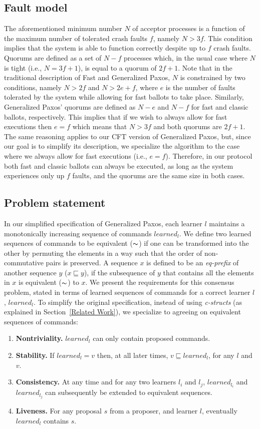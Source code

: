 \subsection{Fault model}
The aforementioned minimum number $N$ of acceptor processes is a function of the maximum number of tolerated crash faults $f$, namely $N > 3f$. This condition implies that the system is able to function correctly despite up to $f$ crash faults. Quorums are defined as a set of $N-f$ processes which, in the usual case where $N$ is tight (i.e., $N=3f+1$), is equal to a quorum of $2f+1$. Note that in the traditional description of Fast and Generalized Paxos, $N$ is constrained by two conditions, namely $N>2f$ and $N>2e+f$, where $e$ is the number of faults tolerated by the system while allowing for fast ballots to take place. Similarly, Generalized Paxos' quorums are defined as $N-e$ and $N-f$ for fast and classic ballots, respectively. This implies that if we wish to always allow for fast executions then $e=f$ which means that $N>3f$ and both quorums are $2f+1$. The same reasoning applies to our CFT version of Generalized Paxos, but, since our goal is to simplify its description, we specialize the algorithm to the case where we always allow for fast executions (i.e., $e=f$). Therefore, in our protocol both fast and classic ballots can always be executed, as long as the system experiences only up $f$ faults, and the quorums are the same size in both cases.

\subsection{Problem statement} \label{cft_problem}
In our simplified specification of Generalized Paxos, each learner $l$ maintains a monotonically increasing sequence of commands $learned_l$. We define two learned sequences of commands to be equivalent ($\thicksim$) if one can be transformed into the other by permuting the elements in a way such that the order of non-commutative pairs is preserved. A sequence $x$ is defined to be an \textit{eq-prefix} of another sequence $y$ ($x \sqsubseteq y$), if the subsequence of $y$ that contains all the elements in $x$ is equivalent ($\thicksim$) to $x$. We present the requirements for this consensus problem, stated in terms of learned sequences of commands for a correct learner $l$, $learned_l$. To simplify the original specification, instead of using \textit{c-structs} (as explained in Section~\ref{Related Work}), we specialize to agreeing on equivalent sequences of commands:

\begin{enumerate}
	\item \textbf{Nontriviality.} $learned_l$ can only contain proposed commands. 
	\item \textbf{Stability.} If $learned_l = v$ then, at all later times, $v \sqsubseteq learned_l$, for any $l$ and $v$. 
	\item \textbf{Consistency.}  At any time and for any two learners $l_i$ and $l_j$, $learned_{l_i}$ and $learned_{l_j}$ can subsequently be extended to equivalent sequences.
	\item \textbf{Liveness.} For any proposal $s$ from a proposer, and learner $l$, eventually $learned_l$ contains $s$.
\end{enumerate}
